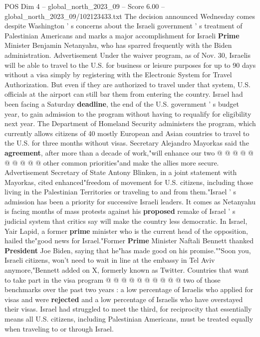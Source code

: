 \begin{textsample}{POS Dim 4 – global\_north\_2023\_09 – Score 6.00 – global\_north\_2023\_09/102123433.txt}  \label{ex:f4_pos_417}
The decision announced Wednesday comes despite Washington ' s concerns about the Israeli government ' s treatment of Palestinian Americans and marks a major accomplishment for Israeli \textbf{Prime} Minister Benjamin Netanyahu, who has sparred frequently with the Biden administration.
Advertisement Under the waiver program, as of Nov. 30, Israelis will be able to travel to the U.S. for business or leisure purposes for up to 90 days without a visa simply by registering with the Electronic System for Travel Authorization.
But even if they are authorized to travel under that system, U.S. officials at the airport can still bar them from entering the country.
Israel had been facing a Saturday \textbf{deadline}, the end of the U.S. government ' s budget year, to gain admission to the program without having to requalify for eligibility next year.
The Department of Homeland Security administers the program, which currently allows citizens of 40 mostly European and Asian countries to travel to the U.S. for three months without visas.
Secretary Alejandro Mayorkas said the \textbf{agreement}, after more than a decade of work,"will enhance our two @ @ @ @ @ @ @ @ @ @ other common priorities"and make the allies more secure.
Advertisement Secretary of State Antony Blinken, in a joint statement with Mayorkas, cited enhanced"freedom of movement for U.S. citizens, including those living in the Palestinian Territories or traveling to and from them."Israel ' s admission has been a priority for successive Israeli leaders.
It comes as Netanyahu is facing months of mass protests against his \textbf{proposed} remake of Israel ' s judicial system that critics say will make the country less democratic.
In Israel, Yair Lapid, a former \textbf{prime} minister who is the current head of the opposition, hailed the"good news for Israel."Former \textbf{Prime} Minister Naftali Bennett thanked \textbf{President} Joe Biden, saying that he"has made good on his promise.""Soon you, Israeli citizens, won't need to wait in line at the embassy in Tel Aviv anymore,"Bennett added on X, formerly known as Twitter.
Countries that want to take part in the visa program @ @ @ @ @ @ @ @ @ @ two of those benchmarks over the past two years : a low percentage of Israelis who applied for visas and were \textbf{rejected} and a low percentage of Israelis who have overstayed their visas.
Israel had struggled to meet the third, for reciprocity that essentially means all U.S. citizens, including Palestinian Americans, must be treated equally when traveling to or through Israel.

\end{textsample}
